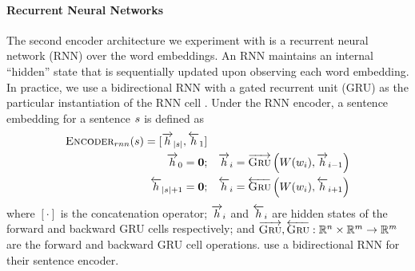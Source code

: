 \paragraph{Recurrent Neural Networks} The second encoder architecture
we experiment with is a recurrent neural network (RNN) over the word
embeddings. An RNN maintains an internal ``hidden'' state that is sequentially
updated upon observing each word embedding. In practice, we use a bidirectional
RNN with a gated recurrent unit (GRU) as the particular instantiation of 
the RNN cell \citep{cho2014learning}.
Under the RNN encoder, a sentence embedding for a sentence $s$ is defined 
as
\begin{align}
\textsc{Encoder}_{rnn}(s) = [\overrightarrow{h}_{|s|}, \overleftarrow{h}_{1} ] & \\
  \overrightarrow{h}_0 = \mathbf{0};& \quad 
  \overrightarrow{h}_i = \overrightarrow{\textsc{Gru}}\left(W(w_i), \overrightarrow{h}_{i-1}\right) \\
  \overleftarrow{h}_{|s| + 1} = \mathbf{0};& \quad 
  \overleftarrow{h}_i = \overleftarrow{\textsc{Gru}}\left(W(w_i), \overleftarrow{h}_{i+1}\right) 
\end{align}
where $[\cdot]$ is the concatenation operator; $\overrightarrow{h}_i$ and $\overleftarrow{h}_i$ are
hidden states of the forward and backward GRU cells respectively; and 
$\overrightarrow{\textsc{Gru}}, \overleftarrow{\textsc{Gru}} : \mathbb{R}^n \times \mathbb{R}^m 
\rightarrow \mathbb{R}^m$ are the forward and backward GRU cell 
operations.
\cite{nallapati2016summarunner} use a bidirectional RNN for their sentence
encoder.

